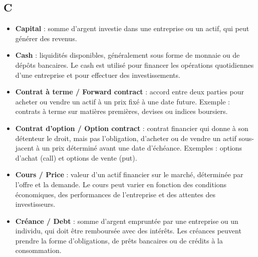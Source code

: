 \documentclass[a4paper,10pt]{article}
\begin{document}
\begin{multicols}{2}
\section*{C}
\begin{itemize}
  \item \textbf{Capital} : somme d’argent investie dans une entreprise ou un actif, qui peut générer des revenus.
  \item \textbf{Cash} : liquidités disponibles, généralement sous forme de monnaie ou de dépôts bancaires. Le cash est utilisé pour financer les opérations quotidiennes d’une entreprise et pour effectuer des investissements.
  \item \textbf{Contrat à terme / Forward contract} : accord entre deux parties pour acheter ou vendre un actif à un prix fixé à une date future. Exemple : contrats à terme sur matières premières, devises ou indices boursiers.
  \item \textbf{Contrat d’option / Option contract} : contrat financier qui donne à son détenteur le droit, mais pas l’obligation, d’acheter ou de vendre un actif sous-jacent à un prix déterminé avant une date d’échéance. Exemples : options d’achat (call) et options de vente (put).
  \item \textbf{Cours / Price} : valeur d’un actif financier sur le marché, déterminée par l’offre et la demande. Le cours peut varier en fonction des conditions économiques, des performances de l’entreprise et des attentes des investisseurs.
  \item \textbf{Créance / Debt} : somme d’argent empruntée par une entreprise ou un individu, qui doit être remboursée avec des intérêts. Les créances peuvent prendre la forme d’obligations, de prêts bancaires ou de crédits à la consommation.
\end{itemize}


\end{multicols}
\end{document}
